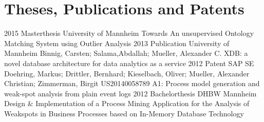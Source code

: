 \documentclass[a4paper]{friggeri-cv}
\begin{document}
\section{Theses, Publications and Patents}
\begin{entrylist}
	\entry
	 {2015}
    {Masterthesis}
    {University of Mannheim}
    {Towards An unsupervised Ontology Matching System using Outlier Analysis}
	\eduentry
	 {2013}
    {Publication}
    {University of Mannheim}
    {Binnig, Carsten; Salama,Abdallah; Mueller, Alexander C.}
    {XDB: a novel database architecture for data analytics as a service}
	\eduentry
	 {2012}
    {Patent}
    {SAP SE}
    {Doehring, Markus; Drittler, Bernhard; Kieselbach, Oliver; Mueller, Alexander Christian; Zimmerman, Birgit}
	{US20140058789 A1: Process model generation and weak-spot analysis from plain event logs}
	\entry
	 {2012}
    {Bachelorthesis}
    {DHBW Mannheim}
    {Design \& Implementation of a Process Mining Application for the Analysis of Weakspots in Business Processes based on In-Memory Database Technology }
\end{entrylist}



\end{document}
